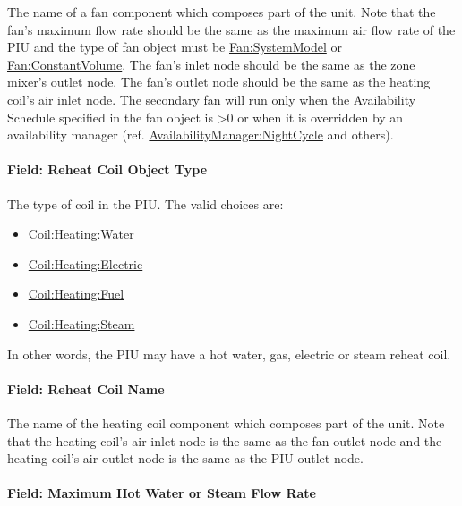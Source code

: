 The name of a fan component which composes part of the unit. Note that the fan's maximum flow rate should be the same as the maximum air flow rate of the PIU and the type of fan object must be \hyperref[fansystemmodel]{Fan:SystemModel} or \hyperref[fanconstantvolume]{Fan:ConstantVolume}. The fan's inlet node should be the same as the zone mixer's outlet node. The fan's outlet node should be the same as the heating coil's air inlet node. The secondary fan will run only when the Availability Schedule specified in the fan object is >0 or when it is overridden by an availability manager (ref. \hyperref[availabilitymanagernightcycle]{AvailabilityManager:NightCycle} and others).

\paragraph{Field: Reheat Coil Object Type}\label{field-reheat-coil-object-type-3}

The type of coil in the PIU. The valid choices are:

\begin{itemize}
\item
  \hyperref[coilheatingwater]{Coil:Heating:Water}
\item
  \hyperref[coilheatingelectric]{Coil:Heating:Electric}
\item
  \hyperref[coilheatinggas-000]{Coil:Heating:Fuel}
\item
  \hyperref[coilheatingsteam]{Coil:Heating:Steam}
\end{itemize}

In other words, the PIU may have a hot water, gas, electric or steam reheat coil.

\paragraph{Field: Reheat Coil Name}\label{field-reheat-coil-name-3}

The name of the heating coil component which composes part of the unit. Note that the heating coil's air inlet node is the same as the fan outlet node and the heating coil's air outlet node is the same as the PIU outlet node.

\paragraph{Field: Maximum Hot Water or Steam Flow Rate}\label{field-maximum-hot-water-or-steam-flow-rate-4}

